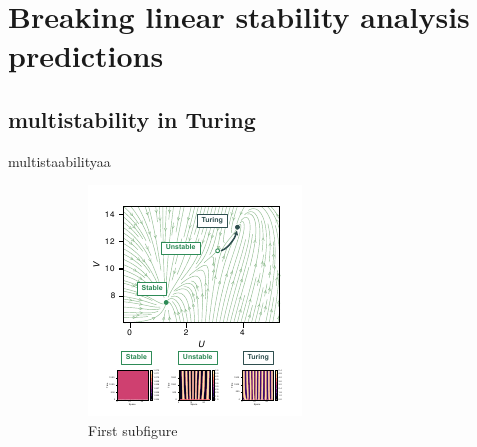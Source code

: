 \section{Breaking linear stability analysis predictions}

\subsection{multistability in Turing}
multistaabilityaa


\begin{figure}[H]
        \centering
        \begin{subfigure}{.5\linewidth}
            \centering
            \includegraphics[width=\linewidth]{chapters/Chapter 1/multistability1}
            \caption{First subfigure}
        \end{subfigure}%
        \begin{subfigure}{.5\linewidth}
            \centering

\end{subfigure}
\end{figure}
